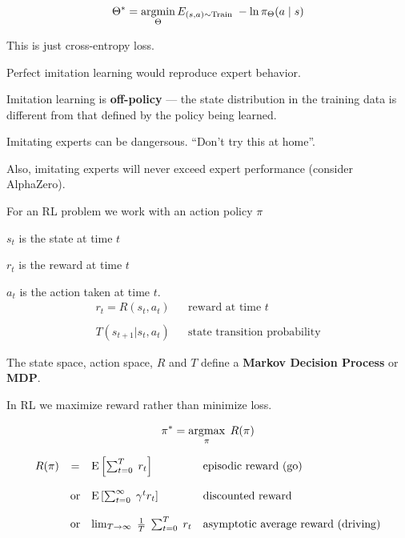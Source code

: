 {\vfill
$$\Theta^* = \operatorname*{argmin}_\Theta E_{(s,a) \sim \mathrm{Train}}\;- \ln \pi_\Theta(a\;|\;s)$$

\vfill
This is just cross-entropy loss.


Perfect imitation learning would reproduce expert behavior.

Imitation learning is {\bf off-policy} ---
the state distribution in the training data is different from that defined by the policy being learned.

\vfill
Imitating experts can be dangersous.  ``Don't try this at home''.

\vfill
Also, imitating experts will never exceed expert performance (consider AlphaZero).


For an RL problem we work with an action policy $\pi$

\vfill
$s_t$ is the state at time $t$

\vfill
$r_t$ is the reward at time $t$

\vfill
$a_t$ is the action taken at time $t$.
\begin{eqnarray*}
  r_t = R(s_t,a_t) & & \mbox{reward at time $t$} \\
  \\
  T(s_{t+1}|s_t,a_t) & & \mbox{state transition probability}
\end{eqnarray*}

\vfill
The state space, action space, $R$ and $T$ define a {\bf Markov Decision Process} or {\bf MDP}.


In RL we maximize reward rather than minimize loss.

$$\pi^* = \operatorname*{argmax}_\pi \;R(\pi)$$

\vfill
$$\begin{array}{rcll}
  R(\pi) & = & \mathrm{E}\left[\sum_{t=0}^T \;r_t\right] &\mbox{episodic reward (go)} \\
\\
& \mbox{or} & \mathrm{E}\left[\sum_{t=0}^\infty \;\gamma^t r_t\right] &\mbox{discounted reward} \\
\\
& \mbox{or} & \lim_{T \rightarrow \infty}\;\frac{1}{T} \;\sum_{t=0}^T \;r_t &\mbox{asymptotic average reward (driving)}
\end{array}$$



}

